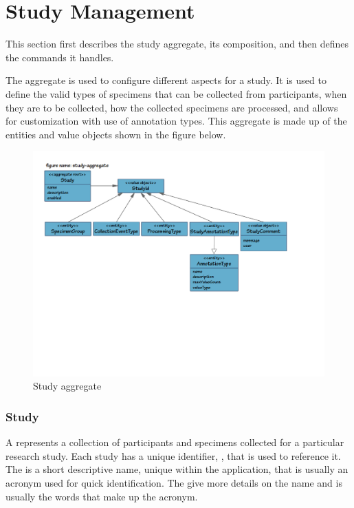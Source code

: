 \chapter{Study Management}
\label{chap:study-management}

This section first describes the study aggregate, its composition, and then
defines the commands it handles.

The  aggregate is used to configure different aspects for a
study. It is used to define the valid types of specimens that can be collected
from participants, when they are to be collected, how the collected specimens
are processed, and allows for customization with use of annotation types. This
aggregate is made up of the entities and value objects shown in the figure
below.

\begin{figure}[H]
  \centering
  \includegraphics[trim={9mm 76mm 36mm 18mm}, clip,
    width=1\textwidth]{images/study-aggregate}
  \caption{Study aggregate}
  \label{fig:study-aggregate}
\end{figure}

\subsection*{Study}

A  represents a collection of participants and specimens
collected for a particular research study. Each study has a unique identifier,
, that is used to reference it. The  is a short
descriptive name, unique within the application, that is usually an acronym
used for quick identification.  The  give more details on
the name and is usually the words that make up the acronym.

